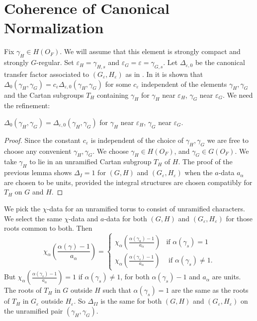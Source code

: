 \documentclass{amsart}
\newenvironment{cthm}[1]
  {\renewcommand\thethm{\bf #1}\thm}
  {\endthm}
\def\varep{\varepsilon}
\def\LANGLANDSD{22}
\begin{document}
\section{Coherence of Canonical Normalization} %

Fix $\gamma_H\in H(O_F)$. We will assume that this element is
strongly compact and strongly $G$-regular. Set $\varep_H=\gamma_{H,s}$
and $\varep_G=\varep=\gamma_{G,s}$.  Let $\Delta_{\varep,0}$
be the canonical transfer factor associated to $(G_\varep,H_{\varep})$
as in \cite{\LANGLANDSD}.  In \cite{\LANGLANDSD} it is shown that
$\Delta_0(\gamma_H,\gamma_G) = c_\varep\Delta_{\varep,0}(
\gamma_H,\gamma_G)$ for some $c_\varep$ independent of the 
elements $\gamma_H, \gamma_G$ and the Cartan subgroups $T_H$
containing $\gamma_H$ for $\gamma_H$ near $\varep_H$, 
$\gamma_G$ near $\varep_G$.  We need the refinement:

\begin{cthm}{Lemma 8.1} $\Delta_0(\gamma_H,\gamma_G) =
\Delta_{\varep,0}(\gamma_H,\gamma_G)$ for
$\gamma_H$ near $\varep_H$, $\gamma_G$ near $\varep_G$.
\end{cthm}

\begin{proof}  Since the constant $c_\varep$ 
is independent of the choice of $\gamma_H,\gamma_G$
we are free to choose any convenient
$\gamma_H,\gamma_G$.  We choose
$\gamma_H\in H(O_F)$, and $\gamma_G\in G(O_F)$.
We take $\gamma_H$ to lie in an unramified Cartan subgroup $T_H$ of $H$.
The proof of the previous lemma shows
$\Delta_I=1$ for $(G,H)$ and $(G_\varep,H_\varep)$ when 
the $a$-data $a_\alpha$ are chosen to be units, provided
the integral structures are chosen compatibly for $T_H$ on $G$ and $H$.
\end{proof}

We pick the $\chi$-data for an unramified torus to 
consist of unramified characters.  We select the same
$\chi$-data and $a$-data for both $(G,H)$ and
$(G_\varep,H_\varep)$ for those roots common to both.
Then 
$$
\chi_\alpha\left(
\frac{\alpha(\gamma)-1}
    {a_\alpha}
\right)
=\begin{cases}
\chi_\alpha\left(
\frac{\alpha(\gamma_u)-1}
    {a_\alpha}
\right)
&\text{if } \alpha(\gamma_s) = 1\\
\chi_\alpha\left(
\frac{\alpha(\gamma_s)-1}
    {a_\alpha}
\right)
&\text{ if }\alpha(\gamma_s)\ne 1.
\end{cases}
$$
But $\chi_\alpha\left(
\frac{\alpha(\gamma_s)-1}
    {a_\alpha}
\right)=1$ if $\alpha(\gamma_s)\ne 1$,
for both $\alpha(\gamma_s)-1$ and $a_\alpha$
are units.  The roots of $T_H$ in $G$ outside $H$
such that $\alpha(\gamma_s)=1$ are the same as
the roots of $T_H$ in $G_\varep$ outside
$H_{\varep}$.  So
$\Delta_{II}$ is the same for both 
$(G,H)$ and $(G_\varep,H_{\varep})$ on the
unramified pair $(\gamma_H,\gamma_G)$.
\end{document}
